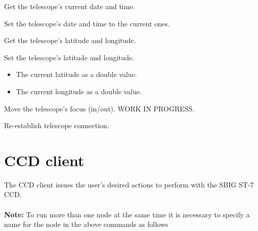 \documentclass[a4paper,english]{article}
\begin{document}
\begin{Description}
\item[\Arg{getdatetime}] Get the telescope's current date and time.

	   
	
\item[\Arg{setdatetime}] Set the telescope's date and time to the current ones.

	   
	
\item[\Arg{getlatlon}] Get the telescope's latitude and longitude.

	   
	
\item[\Arg{setlatlon}] Set the telescope's latitude and longitude.

	     
	
	\begin{itemize}
		\item {} The current latitude as a double value.
		\item {} The current longitude as a double value.
	\end{itemize}
	
\item[\Arg{focus}] Move the telescope's focus (in/out). WORK IN PROGRESS.

\item[\Arg{reconnect}] Re-establish telescope connection.

	   
	
\end{Description}


\section{CCD client}

The CCD client issues the user's desired actions to perform with the SBIG ST-7 CCD. \\

     \\

\textbf{Note:} To run more than one  node at the same time it is necessary to specify a name for the node in the above commands as follows 
\end{document}
